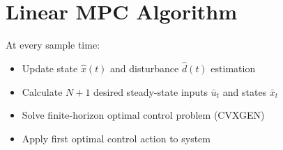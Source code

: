 \ETHslide
\section*{Linear MPC Algorithm}
\vspace*{\fill}

At every sample time:
\begin{itemize}
\item[\ETHitem] Update state $\hat{x}(t)$ and disturbance $\hat{d}(t)$ estimation
\item[\ETHitem] Calculate $N+1$ desired steady-state inputs $\bar{u}_t$ and states $\bar{x}_t$
\item[\ETHitem] Solve finite-horizon optimal control problem (CVXGEN)
\item[\ETHitem] Apply first optimal control action to system
\end{itemize}

\vspace*{\fill}
\clearpage